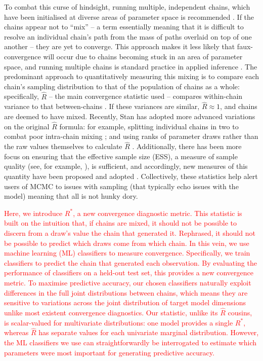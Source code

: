 \documentclass{article}
\begin{document}
To combat this curse of hindsight, running multiple, independent chains, which have been initialised at diverse areas of parameter space is recommended \citep{gelman1992inference}. If the chains appear not to ``mix'' -- a term essentially meaning that it is difficult to resolve an individual chain's path from the mass of paths overlaid on top of one another -- they are yet to converge. This approach makes it less likely that faux-convergence will occur due to chains becoming stuck in an area of parameter space, and running multiple chains is standard practice in applied inference \citep{lambert2018Student}. The predominant approach to quantitatively measuring this mixing is to compare each chain's sampling distribution to that of the population of chains as a whole: specifically, $\widehat{R}$ -- the main convergence statistic used -- compares within-chain variance to that between-chains \citep{gelman1992inference}. If these variances are similar, $\widehat{R}\approx 1$, and chains are deemed to have mixed. Recently, Stan has adopted more advanced variations on the original $\widehat{R}$ formula: for example, splitting individual chains in two to combat poor intra-chain mixing \citep{gelman2013bayesian}; and using ranks of parameter draws rather than the raw values themselves to calculate $\widehat{R}$ \citep{vehtari2019rank}. Additionally, there has been more focus on ensuring that the effective sample size (ESS), a measure of sample quality (see, for example, \cite{lambert2018Student}), is sufficient, and accordingly, new measures of this quantity have been proposed \citep{vehtari2019rank} and adopted \citep{carpenter2017stan}. Collectively, these statistics help alert users of MCMC to issues with sampling (that typically echo issues with the model) meaning that all is not hunky dory.

\textcolor{red}{Here, we introduce $R^*$, a new convergence diagnostic metric. This statistic is built on the intuition that, if chains are mixed, it should not be possible to discern from a draw's value the chain that generated it. Rephrased, it should not be possible to predict which draws come from which chain. In this vein, we use machine learning (ML) classifiers to measure convergence. Specifically, we train classifiers to predict the chain that generated each observation. By evaluating the performance of classifiers on a held-out test set, this provides a new convergence metric. To maximise predictive accuracy, our chosen classifiers naturally exploit differences in the full joint distributions between chains, which means they are sensitive to variations across the joint distribution of target model dimensions unlike most existent convergence diagnostics. Our statistic, unlike its $\widehat{R}$ cousins, is scalar-valued for multivariate distributions: one model provides a single $R^*$, whereas $\widehat{R}$ has separate values for each univariate marginal distribution. However, the ML classifiers we use can straightforwardly be interrogated to estimate which parameters were most important for generating predictive accuracy.}
\end{document}
